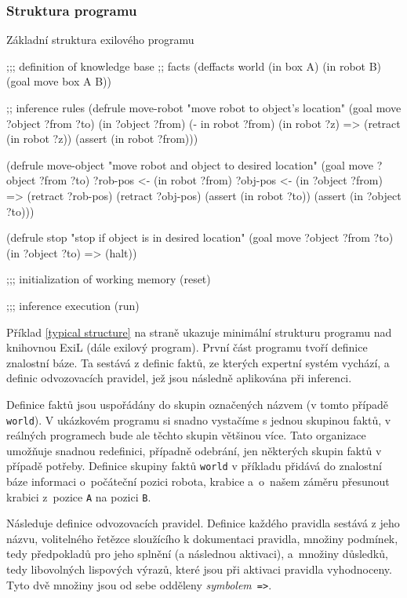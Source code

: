 \subsubsection{Struktura programu}

\begin{listing}[h]
\caption{Základní struktura exilového programu}
\label{typical structure}
\begin{clcode}
;;; definition of knowledge base
;; facts
(deffacts world
  (in box A)
  (in robot B)
  (goal move box A B))

;; inference rules
(defrule move-robot
  "move robot to object's location"
  (goal move ?object ?from ?to)
  (in ?object ?from)
  (- in robot ?from)
  (in robot ?z)
  =>
  (retract (in robot ?z))
  (assert (in robot ?from)))

(defrule move-object
  "move robot and object to desired location"
  (goal move ?object ?from ?to)
  ?rob-pos <- (in robot ?from)
  ?obj-pos <- (in ?object ?from)
  =>
  (retract ?rob-pos)
  (retract ?obj-pos)
  (assert (in robot ?to))
  (assert (in ?object ?to)))

(defrule stop
  "stop if object is in desired location"
  (goal move ?object ?from ?to)
  (in ?object ?to)
  =>
  (halt))

;;; initialization of working memory
(reset)

;;; inference execution
(run)
\end{clcode}
\end{listing}

Příklad \ref{typical structure} na straně \pageref{typical structure} ukazuje
minimální strukturu programu nad knihovnou ExiL (dále exilový program). První
část programu tvoří definice znalostní báze. Ta sestává z definic faktů, ze
kterých expertní systém vychází, a definic odvozovacích pravidel, jež jsou
následně aplikována při inferenci.

Definice faktů jsou uspořádány do skupin označených názvem (v tomto případě
\verb|world|). V ukázkovém programu si snadno vystačíme s jednou skupinou faktů,
v reálných programech bude ale těchto skupin většinou více. Tato organizace
umožňuje snadnou redefinici, případně odebrání, jen některých skupin faktů v
případě potřeby.  Definice skupiny faktů \verb|world| v příkladu přidává do
znalostní báze informaci o~počáteční pozici robota, krabice a~o~našem záměru
přesunout krabici z~pozice \verb|A| na pozici \verb|B|.

Následuje definice odvozovacích pravidel. Definice každého pravidla sestává z
jeho názvu, volitelného řetězce sloužícího k dokumentaci pravidla,
množiny podmínek, tedy předpokladů pro jeho splnění (a následnou aktivaci),
a~množiny důsledků, tedy libovolných lispových výrazů, které jsou při
aktivaci pravidla vyhodnoceny.  Tyto dvě množiny jsou od sebe odděleny
\emph{symbolem}~\verb|=>|.

